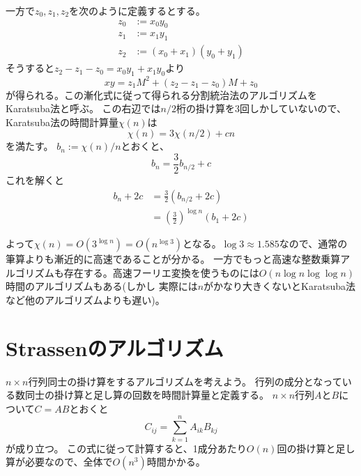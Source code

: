 \documentclass[a4paper,twoside,onecolumn,openany,article,10pt]{memoir}
\theoremstyle{definition}
\theoremstyle{remark}
\begin{document}
一方で$z_0, z_1, z_2$を次のように定義するとする。
\begin{align*}
z_0 &:= x_0y_0\\
z_1 &:= x_1y_1\\
z_2 &:= (x_0+x_1)(y_0+y_1)
\end{align*}
そうすると$z_2-z_1-z_0=x_0y_1+x_1y_0$より
\begin{equation*}
xy = z_1 M^2 + (z_2-z_1-z_0) M + z_0
\end{equation*}
が得られる。この漸化式に従って得られる分割統治法のアルゴリズムをKaratsuba法と呼ぶ。
この右辺では$n/2$桁の掛け算を3回しかしていないので、Karatsuba法の時間計算量$\chi(n)$は
\begin{equation*}
\chi(n) = 3\chi(n/2) + cn
\end{equation*}
を満たす。
$b_n:=\chi(n)/n$とおくと、
\begin{equation*}
b_n = \frac{3}{2} b_{n/2} + c
\end{equation*}
これを解くと
\begin{align*}
b_n + 2c &= \frac{3}{2} \left(b_{n/2} + 2c\right)\\
&= \left(\frac{3}{2}\right)^{\log n} \left(b_{1} + 2c\right)
\end{align*}

よって$\chi(n) = O(3^{\log n}) = O(n^{\log 3})$となる。$\log 3 \approx 1.585$なので、通常の筆算よりも漸近的に高速であることが分かる。
一方でもっと高速な整数乗算アルゴリズムも存在する。高速フーリエ変換を使うものには$O(n\log n \log\log n)$時間のアルゴリズムもある(しかし
実際には$n$がかなり大きくないとKaratsuba法など他のアルゴリズムよりも遅い)。


\section{Strassenのアルゴリズム}
$n\times n$行列同士の掛け算をするアルゴリズムを考えよう。
行列の成分となっている数同士の掛け算と足し算の回数を時間計算量と定義する。
$n\times n$行列$A$と$B$について$C=AB$とおくと
\begin{equation*}
C_{ij} = \sum_{k=1}^n A_{ik}B_{kj}
\end{equation*}
が成り立つ。
この式に従って計算すると、1成分あたり$O(n)$回の掛け算と足し算が必要なので、全体で$O(n^3)$時間かかる。
\end{document}
